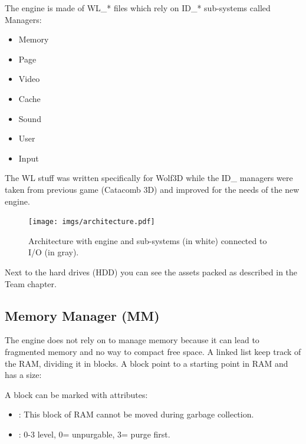 \documentclass[book.tex]{subfiles}
\begin{document}
The engine is made of WL\_* files which rely on ID\_* sub-systems called Managers:
\begin{itemize}
	\item Memory
	\item Page
	\item Video
	\item Cache
	\item Sound
	\item User
	\item Input
\end{itemize}
The WL stuff was written specifically for Wolf3D while the ID\_ managers were taken from previous game (Catacomb 3D) and improved for the needs of the new engine.

\begin{figure}[H]
\centering
\texttt{[image: imgs/architecture.pdf]}
\caption{Architecture with engine and sub-systems (in white) connected to I/O (in gray).}
\label{fig:architecture}
\end{figure}
Next to the hard drives (HDD) you can see the assets packed as described in the Team chapter.










\subsection{Memory Manager (MM)}
The engine does not rely on  to manage memory because it can lead to fragmented memory and no way to compact free space. A linked list keep track of the RAM, dividing it in blocks. A block
point to a starting point in RAM and has a size:\\
 \par

 \par
A block can be marked with attributes:
\begin{itemize}
\item {} : This block of RAM cannot be moved during garbage collection.
\item {} : 0-3 level, 0= unpurgable, 3= purge first.
\end{itemize}
\end{document}
